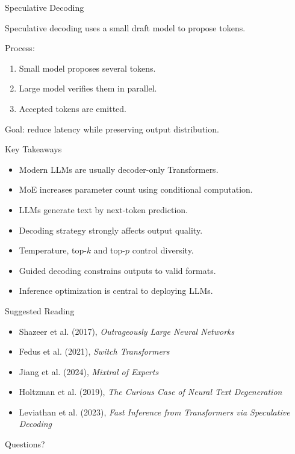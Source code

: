 \documentclass[aspectratio=169]{beamer}
\begin{document}
\begin{frame}{Speculative Decoding}

Speculative decoding uses a small draft model to propose tokens.

\vspace{0.4cm}

Process:

\begin{enumerate}
    \item Small model proposes several tokens.
    \item Large model verifies them in parallel.
    \item Accepted tokens are emitted.
\end{enumerate}

\vspace{0.4cm}

Goal: reduce latency while preserving output distribution.

\end{frame}

\begin{frame}{Key Takeaways}

\begin{itemize}
    \item Modern LLMs are usually decoder-only Transformers.
    \item MoE increases parameter count using conditional computation.
    \item LLMs generate text by next-token prediction.
    \item Decoding strategy strongly affects output quality.
    \item Temperature, top-$k$ and top-$p$ control diversity.
    \item Guided decoding constrains outputs to valid formats.
    \item Inference optimization is central to deploying LLMs.
\end{itemize}

\end{frame}

\begin{frame}{Suggested Reading}

\begin{itemize}
    \item Shazeer et al. (2017), \textit{Outrageously Large Neural Networks}
    \item Fedus et al. (2021), \textit{Switch Transformers}
    \item Jiang et al. (2024), \textit{Mixtral of Experts}
    \item Holtzman et al. (2019), \textit{The Curious Case of Neural Text Degeneration}
    \item Leviathan et al. (2023), \textit{Fast Inference from Transformers via Speculative Decoding}
\end{itemize}

\end{frame}

\begin{frame}
\centering
\Huge Questions?
\end{frame}
\end{document}
